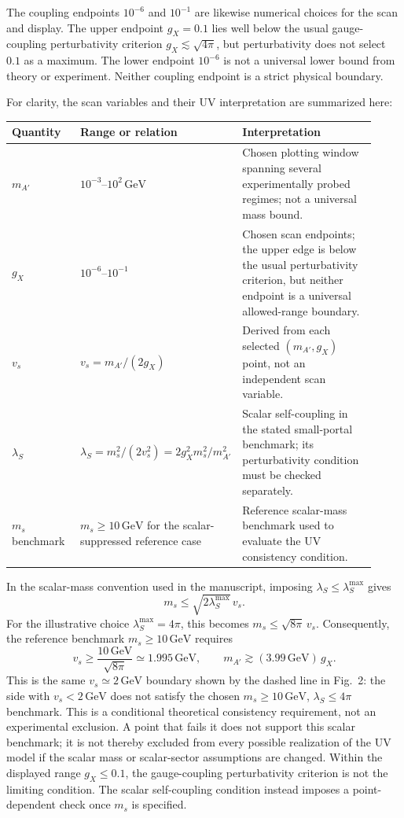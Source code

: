 \documentclass[12pt,a4paper]{article}
\begin{document}
The coupling endpoints \(10^{-6}\) and \(10^{-1}\) are likewise numerical choices for the scan and display. The upper endpoint \(g_X=0.1\) lies well below the usual gauge-coupling perturbativity criterion \(g_X\lesssim\sqrt{4\pi}\), but perturbativity does not select \(0.1\) as a maximum. The lower endpoint \(10^{-6}\) is not a universal lower bound from theory or experiment. Neither coupling endpoint is a strict physical boundary.

For clarity, the scan variables and their UV interpretation are summarized here:
\begin{center}
\small
\begin{tabular}{@{}P{0.19\linewidth}P{0.34\linewidth}P{0.39\linewidth}@{}}
\hline
Quantity & Range or relation & Interpretation\\
\hline
\(m_{A'}\) & \(10^{-3}\)--\(10^2\,\mathrm{GeV}\) & Chosen plotting window spanning several experimentally probed regimes; not a universal mass bound.\\
\(g_X\) & \(10^{-6}\)--\(10^{-1}\) & Chosen scan endpoints; the upper edge is below the usual perturbativity criterion, but neither endpoint is a universal allowed-range boundary.\\
\(v_s\) & \(v_s=m_{A'}/(2g_X)\) & Derived from each selected \((m_{A'},g_X)\) point, not an independent scan variable.\\
\(\lambda_S\) & \(\lambda_S=m_s^2/(2v_s^2)=2g_X^2m_s^2/m_{A'}^2\) & Scalar self-coupling in the stated small-portal benchmark; its perturbativity condition must be checked separately.\\
\(m_s\) benchmark & \(m_s\geq10\,\mathrm{GeV}\) for the scalar-suppressed reference case & Reference scalar-mass benchmark used to evaluate the UV consistency condition.\\
\hline
\end{tabular}
\end{center}

In the scalar-mass convention used in the manuscript, imposing \(\lambda_S\leq\lambda_S^{\max}\) gives
\[
m_s\leq\sqrt{2\lambda_S^{\max}}\,v_s.
\]
For the illustrative choice \(\lambda_S^{\max}=4\pi\), this becomes \(m_s\leq\sqrt{8\pi}\,v_s\). Consequently, the reference benchmark \(m_s\geq10\,\mathrm{GeV}\) requires
\[
v_s\geq\frac{10\,\mathrm{GeV}}{\sqrt{8\pi}}
\simeq1.995\,\mathrm{GeV},
\qquad
m_{A'}\gtrsim(3.99\,\mathrm{GeV})\,g_X.
\]
This is the same \(v_s\simeq2\,\mathrm{GeV}\) boundary shown by the dashed line in Fig.~2: the side with \(v_s<2\,\mathrm{GeV}\) does not satisfy the chosen \(m_s\geq10\,\mathrm{GeV}\), \(\lambda_S\leq4\pi\) benchmark. This is a conditional theoretical consistency requirement, not an experimental exclusion. A point that fails it does not support this scalar benchmark; it is not thereby excluded from every possible realization of the UV model if the scalar mass or scalar-sector assumptions are changed. Within the displayed range \(g_X\leq0.1\), the gauge-coupling perturbativity criterion is not the limiting condition. The scalar self-coupling condition instead imposes a point-dependent check once \(m_s\) is specified.
\end{document}
